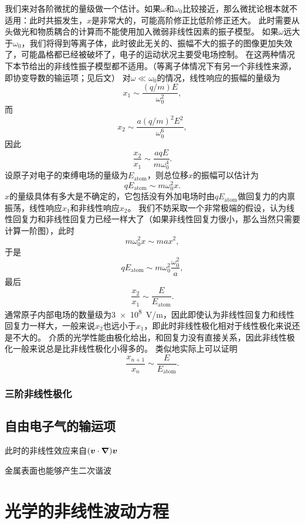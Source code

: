 \documentclass[UTF8, a4paper]{ctexart}
\begin{document}
我们来对各阶微扰的量级做一个估计。如果$\omega$和$\omega_0$比较接近，那么微扰论根本就不适用：此时共振发生，$x$是非常大的，可能高阶修正比低阶修正还大。
此时需要从头做光和物质耦合的计算而不能使用加入微弱非线性因素的振子模型。
如果$\omega$远大于$\omega_0$，我们将得到等离子体，此时彼此无关的、振幅不大的振子的图像更加失效了，可能晶格都已经被破坏了，电子的运动状况主要受电场控制。
在这两种情况下本节给出的非线性振子模型都不适用。（等离子体情况下有另一个非线性来源，即协变导数的输运项；见后文）
对$\omega \ll \omega_0$的情况，线性响应的振幅的量级为
\[
    x_1 \sim \frac{(q/m) E}{\omega_0^2},
\]
而
\[
    x_2 \sim \frac{a (q/m)^2 E^2}{\omega_0^6},
\]
因此
\begin{equation}
    \frac{x_2}{x_1} \sim \frac{a q E}{m \omega_0^4}.
\end{equation}
设原子对电子的束缚电场的量级为$E_\text{atom}$，则总位移$x$的振幅可以估计为
\[
    q E_\text{atom} \sim m \omega_0^2 x .
\]
$x$的量级具体有多大是不确定的，它包括没有外加电场时由$q E_\text{atom}$做回复力的内禀振荡，线性响应$x_1$和非线性响应$x_2$。
我们不妨采取一个非常极端的假设，认为线性回复力和非线性回复力已经一样大了（如果非线性回复力很小，那么当然只需要计算一阶图），此时
\[
    m \omega_0^2 x \sim m a x^2,
\]
于是
\[
    q E_\text{atom} \sim m \omega_0^2 \frac{\omega_0^2}{a},
\]
最后
\begin{equation}
    \frac{x_2}{x_1} \sim \frac{E}{E_\text{atom}}.
\end{equation}
通常原子内部电场的数量级为\SI{3e8}{V/m}，因此即使认为非线性回复力和线性回复力一样大，一般来说$x_2$也远小于$x_1$，即此时非线性极化相对于线性极化来说还是不大的。
介质的光学性能由极化给出，和回复力没有直接关系，因此非线性极化一般来说总是比非线性极化小得多的。
类似地实际上可以证明
\begin{equation}
    \frac{x_{n+1}}{x_n} \sim \frac{E}{E_\text{atom}}.
\end{equation}

\subsubsection{三阶非线性极化}

\subsection{自由电子气的输运项}

此时的非线性效应来自$(\vb*{v} \cdot \grad) \vb*{v}$

金属表面也能够产生二次谐波

\section{光学的非线性波动方程}\label{sec:non-linear-maxwell}
\end{document}
